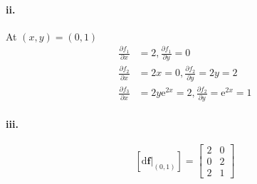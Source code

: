 \documentclass[11pt, a4paper]{article}
\begin{document}
\paragraph{ii.}
At $(x, y) = (0, 1)$
$$\begin{aligned}
\frac{\partial{f_1}}{\partial{x}} &= 2,
\frac{\partial{f_1}}{\partial{y}} = 0 \\
\frac{\partial{f_2}}{\partial{x}} &= 2x = 0,
\frac{\partial{f_2}}{\partial{y}} = 2y = 2 \\
\frac{\partial{f_3}}{\partial{x}} &= 2y\mathrm{e} ^ {2x} = 2,\frac{\partial{f_2}}{\partial{y}} = \mathrm{e} ^ {2x} = 1
\end{aligned}$$

\paragraph{iii.}
$$[\mathrm{d}\bm{f}|_{(0, 1)}] = 
\begin{bmatrix}
    2 & 0 \\
    0 & 2 \\
    2 & 1
\end{bmatrix}$$
\end{document}
